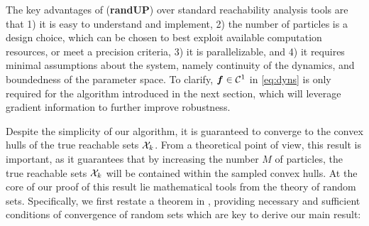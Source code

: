 \documentclass{article}
\begin{document}



The key advantages of (\textbf{randUP}) over standard reachability analysis tools are that 
1) it is easy to understand and implement, 
2) the number of particles is a design choice, which can be chosen to best exploit available computation resources, or meet a precision criteria,
3) it is parallelizable, and 
4) it requires minimal assumptions about the system, namely continuity of the dynamics, and boundedness of the parameter space. 
To clarify, $\bm{f}\in\mathcal{C}^1$ in \eqref{eq:dyns} is only required for the algorithm introduced in the next section, which will leverage gradient information to further improve robustness.



Despite the simplicity of our algorithm, it is guaranteed to converge to the convex hulls of the true reachable sets $\mathcal{X}_k$. 
From a theoretical point of view, this result is important, as it guarantees that by increasing the number $M$ of particles, the true reachable sets $\mathcal{X}_k$ will be contained within the sampled convex hulls. 
At the core of our proof of this result lie mathematical tools from the theory of random sets. 
Specifically, we first 
restate a theorem in \citep[Prop. 1.7.23]{Molchanov_BookTheoryOfRandomSets2017}, providing necessary and sufficient conditions of convergence of random sets which are key to derive our main result:



\end{document}
